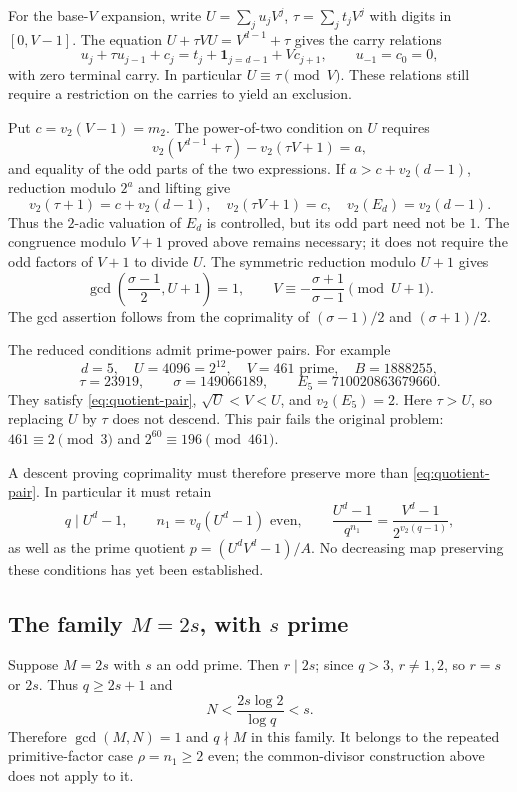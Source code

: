 \documentclass[11pt]{article}
\begin{document}
For the base-$V$ expansion, write
$U=\sum_j u_jV^j$, $\tau=\sum_j t_jV^j$ with digits in $[0,V-1]$.
The equation $U+\tau VU=V^{d-1}+\tau$ gives the carry relations
\[
u_j+\tau u_{j-1}+c_j=t_j+\mathbf1_{j=d-1}+Vc_{j+1},
\qquad u_{-1}=c_0=0,
\]
with zero terminal carry. In particular $U\equiv\tau\pmod V$.
These relations still require a restriction on the carries to yield an exclusion.

Put $c=v_2(V-1)=m_2$. The power-of-two condition on $U$ requires
\[
v_2(V^{d-1}+\tau)-v_2(\tau V+1)=a,
\]
and equality of the odd parts of the two expressions.
If $a>c+v_2(d-1)$, reduction modulo $2^a$ and lifting give
\[
v_2(\tau+1)=c+v_2(d-1),\quad
v_2(\tau V+1)=c,\quad v_2(E_d)=v_2(d-1).
\]
Thus the $2$-adic valuation of $E_d$ is controlled, but its odd part need
not be $1$. The congruence modulo $V+1$ proved above remains necessary;
it does not require the odd factors of $V+1$ to divide $U$.
The symmetric reduction modulo $U+1$ gives
\[
\gcd\left(\frac{\sigma-1}{2},U+1\right)=1,\qquad
V\equiv-\frac{\sigma+1}{\sigma-1}\pmod{U+1}.
\]
The gcd assertion follows from the coprimality of
$(\sigma-1)/2$ and $(\sigma+1)/2$.

The reduced conditions admit prime-power pairs. For example
\[
d=5,\quad U=4096=2^{12},\quad V=461\text{ prime},\quad
B=1888255,
\]
\[
\tau=23919,\qquad\sigma=149066189,\qquad
E_5=710020863679660.
\]
They satisfy \eqref{eq:quotient-pair}, $\sqrt U<V<U$, and
$v_2(E_5)=2$. Here $\tau>U$, so replacing $U$ by $\tau$ does not descend.
This pair fails the original problem: $461\equiv2\pmod3$ and
$2^{60}\equiv196\pmod{461}$.

A descent proving coprimality must therefore preserve more than
\eqref{eq:quotient-pair}. In particular it must retain
\[
q\mid U^d-1,\qquad n_1=v_q(U^d-1)\text{ even},\qquad
\frac{U^d-1}{q^{n_1}}=\frac{V^d-1}{2^{v_2(q-1)}},
\]
as well as the prime quotient $p=(U^dV^d-1)/A$.
No decreasing map preserving these conditions has yet been established.

\subsection{\texorpdfstring{The family $M=2s$, with $s$ prime}{The family M=2s, with s prime}}

Suppose $M=2s$ with $s$ an odd prime. Then $r\mid2s$;
since $q>3$, $r\neq1,2$, so $r=s$ or $2s$.
Thus $q\geq2s+1$ and
\[
N<\frac{2s\log2}{\log q}<s.
\]
Therefore $\gcd(M,N)=1$ and $q\nmid M$ in this family.
It belongs to the repeated primitive-factor case $\rho=n_1\geq2$ even;
the common-divisor construction above does not apply to it.
\end{document}
